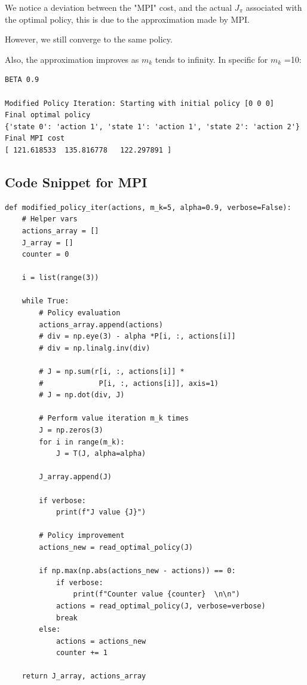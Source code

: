 We notice a deviation between the "MPI" cost, and the actual $J_\pi$ associated with the optimal policy, this is due to the approximation made by MPI.

However, we still converge to the same policy.

Also, the approximation improves as $m_k$ tends to infinity. In specific for $m_k$ =10:

\begin{lstlisting}
BETA 0.9

Modified Policy Iteration: Starting with initial policy [0 0 0]
Final optimal policy
{'state 0': 'action 1', 'state 1': 'action 1', 'state 2': 'action 2'}
Final MPI cost
[ 121.618533  135.816778   122.297891 ]
\end{lstlisting}


\subsection{Code Snippet for MPI} 

\begin{lstlisting}
def modified_policy_iter(actions, m_k=5, alpha=0.9, verbose=False):
    # Helper vars
    actions_array = []
    J_array = []
    counter = 0

    i = list(range(3))

    while True:
        # Policy evaluation
        actions_array.append(actions)
        # div = np.eye(3) - alpha *P[i, :, actions[i]]
        # div = np.linalg.inv(div)

        # J = np.sum(r[i, :, actions[i]] *
        #             P[i, :, actions[i]], axis=1)
        # J = np.dot(div, J)

        # Perform value iteration m_k times
        J = np.zeros(3)
        for i in range(m_k):
            J = T(J, alpha=alpha)

        J_array.append(J)

        if verbose:
            print(f"J value {J}")

        # Policy improvement
        actions_new = read_optimal_policy(J)

        if np.max(np.abs(actions_new - actions)) == 0:
            if verbose:
                print(f"Counter value {counter}  \n\n")
            actions = read_optimal_policy(J, verbose=verbose)
            break
        else:
            actions = actions_new
            counter += 1

    return J_array, actions_array
\end{lstlisting}

